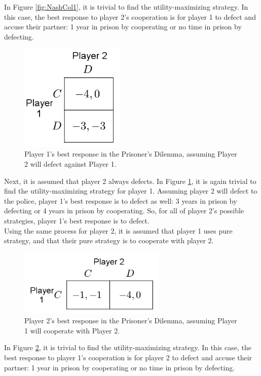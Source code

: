 In Figure \ref{fig:NashCol1}, it is trivial to find the utility-maximizing strategy. In this case, the best response to player 2's cooperation is for player 1 to defect and accuse their partner: 1 year in prison by cooperating or no time in prison by defecting.\\

\begin{figure}[H]
  \centering
  \includegraphics[width=5cm]{figures/ExamplePartialCol2.png}
  \caption{Player 1's best response in the Prisoner's Dilemma, assuming Player 2 will defect against Player 1.}
  \label{fig:NashCol2}
\end{figure}
Next, it is assumed that player 2 always defects. In Figure \ref{fig:NashCol2}, it is again trivial to find the utility-maximizing strategy for player 1. Assuming player 2 will defect to the police, player 1's best response is to defect as well: 3 years in prison by defecting or 4 years in prison by cooperating. So, for all of player 2's possible strategies, player 1's best response is to defect.\\

Using the same process for player 2, it is assumed that player 1 uses pure strategy, and that their pure strategy is to cooperate with player 2.
\begin{figure}[H]
  \centering
  \includegraphics[width=7cm]{figures/ExamplePartialRow1.png}
  \caption{Player 2's best response in the Prisoner's Dilemma, assuming Player 1 will cooperate with Player 2.}
  \label{fig:NashRow1}
\end{figure}

In Figure \ref{fig:NashRow1}, it is trivial to find the utility-maximizing strategy. In this case, the best response to player 1's cooperation is for player 2 to defect and accuse their partner: 1 year in prison by cooperating or no time in prison by defecting.\\

